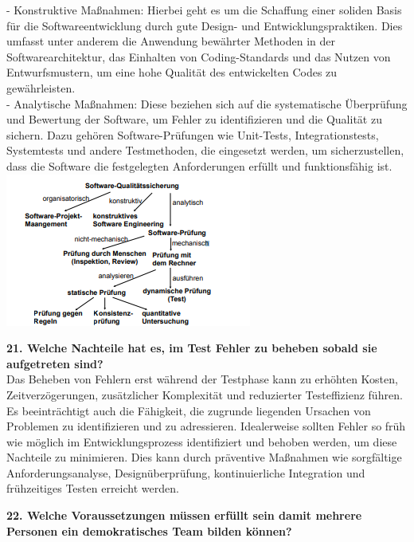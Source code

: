\documentclass{article}
\begin{document}
- Konstruktive Maßnahmen: Hierbei geht es um die Schaffung einer soliden Basis für die Softwareentwicklung durch gute Design- und Entwicklungspraktiken. Dies umfasst unter anderem die Anwendung bewährter Methoden in der Softwarearchitektur, das Einhalten von Coding-Standards und das Nutzen von Entwurfsmustern, um eine hohe Qualität des entwickelten Codes zu gewährleisten.\\
- Analytische Maßnahmen: Diese beziehen sich auf die systematische Überprüfung und Bewertung der Software, um Fehler zu identifizieren und die Qualität zu sichern. Dazu gehören Software-Prüfungen wie Unit-Tests, Integrationstests, Systemtests und andere Testmethoden, die eingesetzt werden, um sicherzustellen, dass die Software die festgelegten Anforderungen erfüllt und funktionsfähig ist.\\
\includegraphics[scale=1.3]{media/QA.png}\\
\textbf{21. Welche Nachteile hat es, im Test Fehler zu beheben sobald sie aufgetreten sind?}\\
Das Beheben von Fehlern erst während der Testphase kann zu erhöhten Kosten, Zeitverzögerungen, zusätzlicher Komplexität und reduzierter Testeffizienz führen. Es beeinträchtigt auch die Fähigkeit, die zugrunde liegenden Ursachen von Problemen zu identifizieren und zu adressieren. Idealerweise sollten Fehler so früh wie möglich im Entwicklungsprozess identifiziert und behoben werden, um diese Nachteile zu minimieren. Dies kann durch präventive Maßnahmen wie sorgfältige Anforderungsanalyse, Designüberprüfung, kontinuierliche Integration und frühzeitiges Testen erreicht werden.\\
\textbf{22. Welche Voraussetzungen müssen erfüllt sein damit mehrere Personen ein demokratisches Team bilden können?}\\
\end{document}
